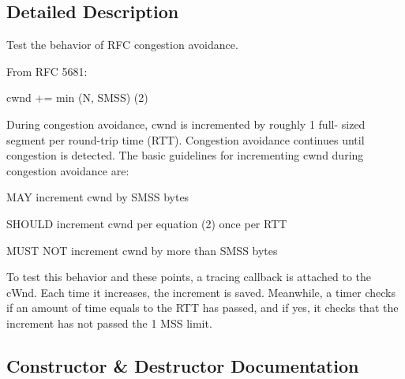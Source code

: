 \subsection{Detailed Description}
Test the behavior of R\+FC congestion avoidance. 

From R\+FC 5681\+:~\newline
\begin{DoxyVerb}cwnd += min (N, SMSS)                      (2)
\end{DoxyVerb}


During congestion avoidance, cwnd is incremented by roughly 1 full-\/ sized segment per round-\/trip time (R\+TT). Congestion avoidance continues until congestion is detected. The basic guidelines for incrementing cwnd during congestion avoidance are\+:


\begin{DoxyItemize}
\item M\+AY increment cwnd by S\+M\+SS bytes
\item S\+H\+O\+U\+LD increment cwnd per equation (2) once per R\+TT
\item M\+U\+ST N\+OT increment cwnd by more than S\+M\+SS bytes
\end{DoxyItemize}

To test this behavior and these points, a tracing callback is attached to the c\+Wnd. Each time it increases, the increment is saved. Meanwhile, a timer checks if an amount of time equals to the R\+TT has passed, and if yes, it checks that the increment has not passed the 1 M\+SS limit. 

\subsection{Constructor \& Destructor Documentation}
